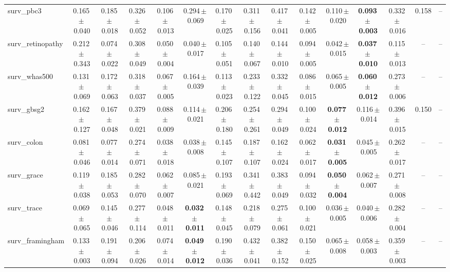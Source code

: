\documentclass[8pt]{extarticle}
\begin{document}
\begin{longtable}{l*{14}{c}}
surv\_pbc3 & 0.165\,$\pm$\,0.040 & 0.185\,$\pm$\,0.018 & 0.326\,$\pm$\,0.052 & 0.106\,$\pm$\,0.013 & 0.294\,$\pm$\,0.069 & 0.170\,$\pm$\,0.025 & 0.311\,$\pm$\,0.156 & 0.417\,$\pm$\,0.041 & 0.142\,$\pm$\,0.005 & 0.110\,$\pm$\,0.020 & \textbf{0.093\,$\pm$\,0.003} & 0.332\,$\pm$\,0.016 & 0.158 & -- \\
surv\_retinopathy & 0.212\,$\pm$\,0.343 & 0.074\,$\pm$\,0.022 & 0.308\,$\pm$\,0.049 & 0.050\,$\pm$\,0.004 & 0.040\,$\pm$\,0.017 & 0.105\,$\pm$\,0.051 & 0.140\,$\pm$\,0.067 & 0.144\,$\pm$\,0.010 & 0.094\,$\pm$\,0.005 & 0.042\,$\pm$\,0.015 & \textbf{0.037\,$\pm$\,0.010} & 0.115\,$\pm$\,0.013 & -- & -- \\
surv\_whas500 & 0.131\,$\pm$\,0.069 & 0.172\,$\pm$\,0.063 & 0.318\,$\pm$\,0.037 & 0.067\,$\pm$\,0.005 & 0.164\,$\pm$\,0.039 & 0.113\,$\pm$\,0.023 & 0.233\,$\pm$\,0.122 & 0.332\,$\pm$\,0.045 & 0.086\,$\pm$\,0.015 & 0.065\,$\pm$\,0.005 & \textbf{0.060\,$\pm$\,0.012} & 0.273\,$\pm$\,0.006 & -- & -- \\
surv\_gbsg2 & 0.162\,$\pm$\,0.127 & 0.167\,$\pm$\,0.048 & 0.379\,$\pm$\,0.021 & 0.088\,$\pm$\,0.009 & 0.114\,$\pm$\,0.021 & 0.206\,$\pm$\,0.180 & 0.254\,$\pm$\,0.261 & 0.294\,$\pm$\,0.049 & 0.100\,$\pm$\,0.024 & \textbf{0.077\,$\pm$\,0.012} & 0.116\,$\pm$\,0.014 & 0.396\,$\pm$\,0.015 & 0.150 & -- \\
surv\_colon & 0.081\,$\pm$\,0.046 & 0.077\,$\pm$\,0.014 & 0.274\,$\pm$\,0.071 & 0.038\,$\pm$\,0.018 & 0.038\,$\pm$\,0.008 & 0.145\,$\pm$\,0.107 & 0.187\,$\pm$\,0.107 & 0.162\,$\pm$\,0.024 & 0.062\,$\pm$\,0.017 & \textbf{0.031\,$\pm$\,0.005} & 0.045\,$\pm$\,0.005 & 0.262\,$\pm$\,0.017 & -- & -- \\
surv\_grace & 0.119\,$\pm$\,0.038 & 0.185\,$\pm$\,0.053 & 0.282\,$\pm$\,0.070 & 0.062\,$\pm$\,0.007 & 0.085\,$\pm$\,0.021 & 0.193\,$\pm$\,0.069 & 0.341\,$\pm$\,0.442 & 0.383\,$\pm$\,0.049 & 0.094\,$\pm$\,0.032 & \textbf{0.050\,$\pm$\,0.004} & 0.062\,$\pm$\,0.007 & 0.271\,$\pm$\,0.008 & -- & -- \\
surv\_trace & 0.069\,$\pm$\,0.065 & 0.145\,$\pm$\,0.046 & 0.277\,$\pm$\,0.114 & 0.048\,$\pm$\,0.011 & \textbf{0.032\,$\pm$\,0.011} & 0.148\,$\pm$\,0.045 & 0.218\,$\pm$\,0.079 & 0.275\,$\pm$\,0.061 & 0.100\,$\pm$\,0.021 & 0.036\,$\pm$\,0.005 & 0.040\,$\pm$\,0.006 & 0.282\,$\pm$\,0.004 & -- & -- \\
surv\_framingham & 0.133\,$\pm$\,0.003 & 0.191\,$\pm$\,0.094 & 0.206\,$\pm$\,0.026 & 0.074\,$\pm$\,0.014 & \textbf{0.049\,$\pm$\,0.012} & 0.190\,$\pm$\,0.036 & 0.432\,$\pm$\,0.041 & 0.382\,$\pm$\,0.152 & 0.150\,$\pm$\,0.025 & 0.065\,$\pm$\,0.008 & 0.058\,$\pm$\,0.003 & 0.359\,$\pm$\,0.003 & -- & -- \\

\end{longtable}
\end{document}
